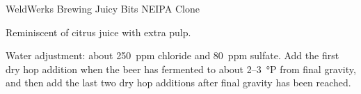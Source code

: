 \begin{recipe}{WeldWerks Brewing Juicy Bits NEIPA Clone}

\begin{aboutblock}
Reminiscent of citrus juice with extra pulp. 
\end{aboutblock}


\begin{methodandtiming}
 
\begin{mashsteps}
\end{mashsteps}

\begin{fermentationsteps}
\end{fermentationsteps}

\begin{directions}
Water adjustment: about 250~ppm chloride and 80~ppm sulfate. Add the first dry hop
addition when the beer has fermented to about 2--3~°P from final gravity,
and then add the last two dry hop additions after final gravity has been reached.
\end{directions}

\end{methodandtiming}

\recipebreak

\begin{ingredientsblock}

\begin{malts}
\end{malts}


\end{ingredientsblock}
\end{recipe}

